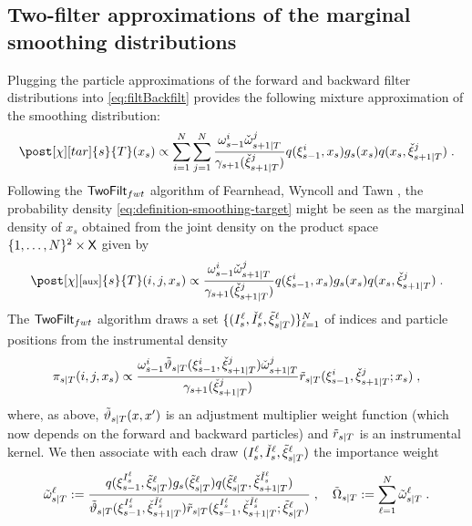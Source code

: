 \subsection{Two-filter approximations of the marginal smoothing distributions}
Plugging the particle approximations of the forward and backward filter distributions into \eqref{eq:filtBackfilt} provides the following mixture approximation of the smoothing distribution:
\begin{equation}
\label{eq:definition-smoothing-target}
\post[\Xinit][tar]{s}{T}(x_s) \propto \sum_{i=1}^N \sum_{j=1}^N \frac{\ewght{s-1}{i} \ebackwght{s+1}{T}{j}}{\gamma_{s+1}(\ebackpart{s+1}{T}{j})}  q(\epart{s - 1}{i},x_s) g_s(x_s) q(x_s, \ebackpart{s+1}{T}{j}) \eqsp.
\end{equation}
Following the $\mathsf{TwoFilt}_{fwt}$ algorithm of Fearnhead, Wyncoll and Tawn \cite{fearnhead:wyncoll:tawn:2010}, the probability density \eqref{eq:definition-smoothing-target} might be seen as
the marginal density of $x_s$ obtained from the joint density on the product space $\{1,\dots,N\}^2 \times \mathsf{X}$ given by
\begin{equation}
\label{eq:definition-smoothing-auxiliary}
\post[\chi][\aux]{s}{T}(i,j, x_s) \propto \frac{\ewght{s-1}{i} \ebackwght{s+1}{T}{j}}{\gamma_{s+1}(\ebackpart{s+1}{T}{j})} q(\epart{s-1}{i},x_s) g_s(x_s) q(x_s,\ebackpart{s+1}{T}{j})\eqsp.
\end{equation}
The $\mathsf{TwoFilt}_{fwt}$ algorithm draws a set $\{(I_{s}^\ell,\check{I}_{s}^\ell,\tilde{\xi}_{s|T}^{\ell}) \}_{\ell=1}^N$ of indices and particle positions from the instrumental density
\begin{equation}
\label{eq:auxiliary-proposal-smoothing}
\instrpostaux{s}{T}(i,j,x_s) \propto  \frac{\ewght{s-1}{i} \adjfunc[smooth]{s}{T}{\epart{s-1}{i},\ebackpart{s+1}{T}{j}} \ebackwght{s+1}{T}{j}}{\gamma_{s+1}(\ebackpart{s+1}{T}{j})} \kiss[smooth]{s}{T}(\epart{s-1}{i},\ebackpart{s+1}{T}{j}; x_s)\eqsp,
\end{equation}
where, as above, $\adjfunc[smooth]{s}{T}{x,x'}$ is an adjustment multiplier weight function (which now depends on the forward and backward particles) and $\kiss[smooth]{s}{T}$ is an instrumental kernel. We then associate with each draw $(I_{s}^\ell,\check{I}_{s}^\ell, \tilde{\xi}_{s|T}^{\ell})$ the importance weight
\begin{equation}
\label{eq:weight-fearnhead}
\smwght{s}{T}{\ell} \eqdef \frac{q(\epart{s-1}{I_{s}^\ell},\smpart{s}{T}{\ell}) g_s(\smpart{s}{T}{\ell}) q(\smpart{s}{T}{\ell},\ebackpart{s+1}{T}{\check{I}_{s}^\ell})}{\adjfunc[smooth]{s}{T}{\epart{s-1}{I_{s}^\ell},\ebackpart{s+1}{T}{\check{I}_{s}^\ell}}
\kiss[smooth]{s}{T}(\epart{s-1}{I_{s}^\ell},\ebackpart{s+1}{T}{\check{I}_{s}^\ell}; \smpart{s}{T}{\ell})}\eqsp,\quad \tilde{\Omega}_{s|T}\eqdef \sum_{\ell=1}^N\smwght{s}{T}{\ell}  \eqsp.
\end{equation}
